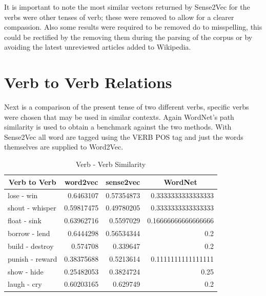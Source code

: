 It is important to note the most similar vectors returned by Sense2Vec for the verbs were other tenses of verb; these were removed to allow for a clearer compassion. Also some results were required to be removed do to misspelling, this could be rectified by the removing them during the parsing of the corpus or by avoiding the latest unreviewed articles added to Wikipedia.

\section{Verb to Verb Relations}
Next is a comparison of the present tense of two different verbs, specific verbs were chosen that may be used in similar contexts. Again WordNet's path similarity is used to obtain a benchmark against the two methods. With Sense2Vec all word are tagged using the VERB POS tag and just the words themselves are supplied to Word2Vec.

\begin{table}[h]
\centering
\begin{tabular}{|l|r|r|r|}
\hline
\multicolumn{1}{|c|}{\textbf{Verb to Verb}} & \multicolumn{1}{c|}{\textbf{word2vec}} & \multicolumn{1}{c|}{\textbf{sense2vec}} & \multicolumn{1}{c|}{\textbf{WordNet}} \\ \hline
lose - win                                  & 0.6463107                              & 0.57354873                              & 0.3333333333333333                    \\ \hline
shout - whisper                             & 0.59817475                             & 0.49780205                              & 0.3333333333333333                    \\ \hline
float - sink                                & 0.63962716                             & 0.5597029                               & 0.16666666666666666                   \\ \hline
borrow - lend                               & 0.6444298                              & 0.56534344                              & 0.2                                   \\ \hline
build - destroy                             & 0.574708                               & 0.339647                                & 0.2                                   \\ \hline
punish - reward                             & 0.38375688                             & 0.5213614                               & 0.1111111111111111                    \\ \hline
show - hide                                 & 0.25482053                             & 0.3824724                               & 0.25                                  \\ \hline
laugh - cry                                 & 0.60203165                             & 0.629749                                & 0.2                                   \\ \hline
\end{tabular}
\caption{Verb - Verb Similarity}
\label{Verb - Verb Similarity}
\end{table}


